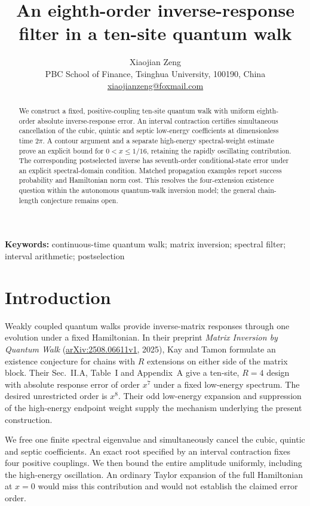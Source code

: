 \documentclass[11pt,a4paper]{article}
\title{An eighth-order inverse-response filter in a ten-site quantum walk}
\author{Xiaojian Zeng\\[3pt]
\small PBC School of Finance, Tsinghua University, 100190, China\\
\small\href{mailto:xiaojianzeng@foxmail.com}{xiaojianzeng@foxmail.com}}
\date{}
\numberwithin{equation}{section}
\begin{document}
\maketitle
\begin{abstract}
We construct a fixed, positive-coupling ten-site quantum walk with uniform
eighth-order absolute inverse-response error. An interval contraction certifies
simultaneous cancellation of the cubic, quintic and septic low-energy coefficients
at dimensionless time $2\pi$. A contour argument and a separate high-energy
spectral-weight estimate prove an explicit bound for $0<x\le1/16$, retaining the
rapidly oscillating contribution. The corresponding postselected inverse has
seventh-order conditional-state error under an explicit spectral-domain condition.
Matched propagation examples report success probability and Hamiltonian norm cost.
This resolves the four-extension existence question within the autonomous
quantum-walk inversion model; the general chain-length conjecture remains open.
\end{abstract}
\noindent\textbf{Keywords:} continuous-time quantum walk; matrix inversion;
spectral filter; interval arithmetic; postselection

\section{Introduction}
Weakly coupled quantum walks provide inverse-matrix responses through one
evolution under a fixed Hamiltonian. In their preprint
\emph{Matrix Inversion by Quantum Walk}
(\href{https://arxiv.org/abs/2508.06611v1}{arXiv:2508.06611v1}, 2025),
Kay and Tamon formulate an existence conjecture for chains with $R$ extensions
on either side of the matrix block. Their Sec.~II.A, Table~I and Appendix~A
give a ten-site, $R=4$ design with absolute response error of order $x^7$
under a fixed low-energy spectrum. The desired unrestricted order is $x^8$.
Their odd low-energy expansion and suppression of the high-energy endpoint
weight supply the mechanism underlying the present construction.

We free one finite spectral eigenvalue and simultaneously cancel the cubic,
quintic and septic coefficients. An exact root specified by an interval
contraction fixes four positive couplings. We then bound the entire amplitude
uniformly, including the high-energy oscillation. An ordinary Taylor expansion
of the full Hamiltonian at $x=0$ would miss this contribution and would not
establish the claimed error order.
\end{document}
